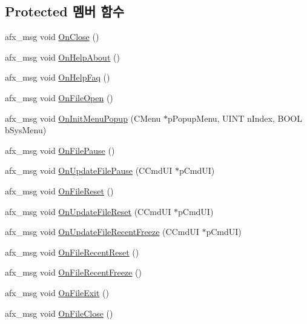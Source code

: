 \subsection*{Protected 멤버 함수}
\begin{DoxyCompactItemize}
\item 
afx\+\_\+msg void \mbox{\hyperlink{class_main_wnd_a81c7de136db9ecc6e98033ae3c3d511c}{On\+Close}} ()
\item 
afx\+\_\+msg void \mbox{\hyperlink{class_main_wnd_a2151b9822f8f20900f98142b3f74d2be}{On\+Help\+About}} ()
\item 
afx\+\_\+msg void \mbox{\hyperlink{class_main_wnd_ad808c9977aa3296be28ded7caad4fe73}{On\+Help\+Faq}} ()
\item 
afx\+\_\+msg void \mbox{\hyperlink{class_main_wnd_ad60908c1c8c44204ea3c87c1109fa468}{On\+File\+Open}} ()
\item 
afx\+\_\+msg void \mbox{\hyperlink{class_main_wnd_ad6e6b4e816151f616328de005d5f5a3d}{On\+Init\+Menu\+Popup}} (C\+Menu $\ast$p\+Popup\+Menu, U\+I\+NT n\+Index, B\+O\+OL b\+Sys\+Menu)
\item 
afx\+\_\+msg void \mbox{\hyperlink{class_main_wnd_a31048c989663d5e2121c2e96b6c8408d}{On\+File\+Pause}} ()
\item 
afx\+\_\+msg void \mbox{\hyperlink{class_main_wnd_a408711da9dc428b4bf0d7335089a4482}{On\+Update\+File\+Pause}} (C\+Cmd\+UI $\ast$p\+Cmd\+UI)
\item 
afx\+\_\+msg void \mbox{\hyperlink{class_main_wnd_ac61e74030dfc91e1439e7b4c6c4ee59c}{On\+File\+Reset}} ()
\item 
afx\+\_\+msg void \mbox{\hyperlink{class_main_wnd_a14c19b1298d7910f712c2aa347e7fe19}{On\+Update\+File\+Reset}} (C\+Cmd\+UI $\ast$p\+Cmd\+UI)
\item 
afx\+\_\+msg void \mbox{\hyperlink{class_main_wnd_a105c377d7748cfb083db564e0f545383}{On\+Update\+File\+Recent\+Freeze}} (C\+Cmd\+UI $\ast$p\+Cmd\+UI)
\item 
afx\+\_\+msg void \mbox{\hyperlink{class_main_wnd_ae80656d038d25f9d3ad2dc7b0d283a54}{On\+File\+Recent\+Reset}} ()
\item 
afx\+\_\+msg void \mbox{\hyperlink{class_main_wnd_a7ea11eb4bb58a99c3aa2a39276c24864}{On\+File\+Recent\+Freeze}} ()
\item 
afx\+\_\+msg void \mbox{\hyperlink{class_main_wnd_a61ca65c37ef1650dfc06de2c3e27891c}{On\+File\+Exit}} ()
\item 
afx\+\_\+msg void \mbox{\hyperlink{class_main_wnd_abf162c1763ea3246bdac171847fb2d9d}{On\+File\+Close}} ()

\end{DoxyCompactItemize}
